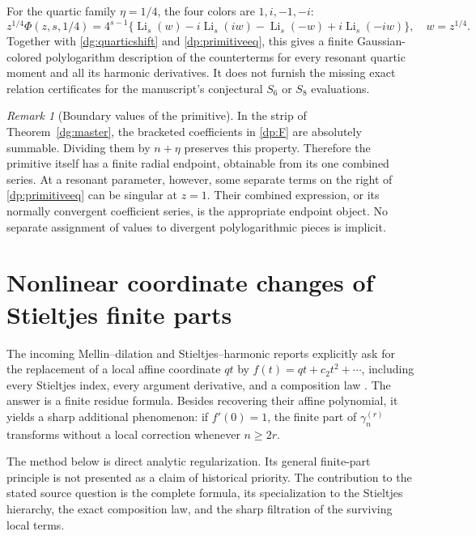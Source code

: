 \documentclass[11pt,a4paper]{article}
\numberwithin{equation}{section}
\theoremstyle{definition}
\theoremstyle{remark}
\newtheorem{remark}[theorem]{Remark}
\DeclareMathOperator{\Li}{Li}
\begin{document}
For the quartic family $\eta=1/4$, the four colors are $1,i,-1,-i$:
\begin{equation}\label{dp:quarterfilter}
 z^{1/4}\Phi(z,s,1/4)=4^{s-1}
 \{\Li_s(w)-i\Li_s(iw)-\Li_s(-w)+i\Li_s(-iw)\},
 \quad w=z^{1/4}.
\end{equation}
Together with \eqref{dg:quarticshift} and
\eqref{dp:primitiveeq}, this gives a finite Gaussian-colored
polylogarithm description of the counterterms for every resonant
quartic moment and all its harmonic derivatives. It does not furnish
the missing exact relation certificates for the manuscript's
conjectural $S_6$ or $S_8$ evaluations.

\begin{remark}[Boundary values of the primitive]\label{dp:boundary}
In the strip of Theorem~\ref{dg:master}, the bracketed coefficients
in \eqref{dp:F} are absolutely summable. Dividing them by
$n+\eta$ preserves this property. Therefore the primitive itself has
a finite radial endpoint, obtainable from its one combined series.
At a resonant parameter, however, some separate terms on the right of
\eqref{dp:primitiveeq} can be singular at $z=1$. Their combined
expression, or its normally convergent coefficient series, is the
appropriate endpoint object. No separate assignment of values to
divergent polylogarithmic pieces is implicit.
\end{remark}


\section{Nonlinear coordinate changes of Stieltjes finite parts}
\label{nc:section}

The incoming Mellin--dilation and Stieltjes--harmonic reports explicitly
ask for the replacement of a local affine coordinate $qt$ by
$f(t)=qt+c_2t^2+\cdots$, including every Stieltjes index, every argument
derivative, and a composition law \cite{incoming-md,incoming-sh}.
The answer is a finite residue formula. Besides recovering their affine
polynomial, it yields a sharp additional phenomenon: if $f'(0)=1$, the
finite part of $\gamma_n^{(r)}$ transforms without a local correction
whenever $n\geq2r$.

The method below is direct analytic regularization. Its general
finite-part principle is not presented as a claim of historical priority.
The contribution to the stated source question is the complete formula,
its specialization to the Stieltjes hierarchy, the exact composition law,
and the sharp filtration of the surviving local terms.
\end{document}
